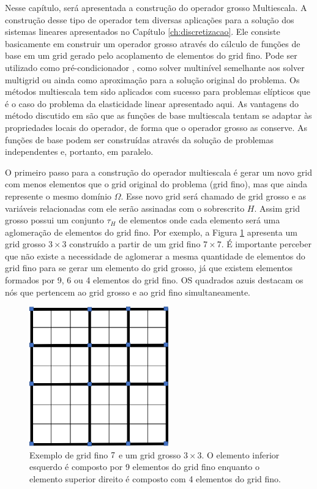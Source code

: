 
Nesse capítulo, será apresentada a construção do operador grosso Multiescala. A construção desse tipo de operador tem diversas aplicações para a solução dos sistemas lineares apresentados no Capítulo \ref{ch:discretizacao}. Ele consiste basicamente em construir um operador grosso através do cálculo de funções de base em um grid gerado pelo acoplamento de elementos do grid fino. Pode ser utilizado como pré-condicionador \cite{casteletto}, como solver multinível semelhante aos solver multigrid ou ainda como aproximação para a solução original do problema. Os métodos multiescala tem sido aplicados com sucesso para problemas elípticos que é o caso do problema da elasticidade linear apresentado aqui. As vantagens do método discutido em \cite{thomashou} são que as funções de base multiescala tentam se adaptar às propriedades locais do operador, de forma que o operador grosso as conserve. As funções de base podem ser construídas através da solução de problemas independentes e, portanto, em paralelo.

O primeiro passo para a construção do operador multiescala é gerar um novo grid com menos elementos que o grid original do problema (grid fino), mas que ainda represente o mesmo domínio $\Omega$. Esse novo grid será chamado de grid grosso e as variáveis relacionadas com ele serão assinadas com o sobrescrito $H$. 
Assim grid grosso possui um conjunto $\tau_H$ de elementos onde cada elemento será uma aglomeração de elementos do grid fino. Por exemplo, a Figura \ref{fig:gridgrosso} apresenta um grid grosso $3\times 3$ construído a partir de um grid fino $7\times 7$. É importante perceber que não existe a necessidade de aglomerar a mesma quantidade de elementos do grid fino para se gerar um elemento do grid grosso, já que existem elementos formados por 9, 6 ou 4 elementos do grid fino. OS quadrados azuis destacam os nós que pertencem ao grid grosso e ao grid fino simultaneamente.

\begin{figure}[!htbp]
\centering
\includegraphics[width=6cm]{chap06/figs/grosso.png}
\caption{Exemplo de grid fino $7\time 7$ e um grid grosso $3\times 3$. O elemento inferior esquerdo é composto por 9 elementos do grid fino enquanto o elemento superior direito é composto com 4 elementos do grid fino.}
\label{fig:gridgrosso}

\end{figure}


